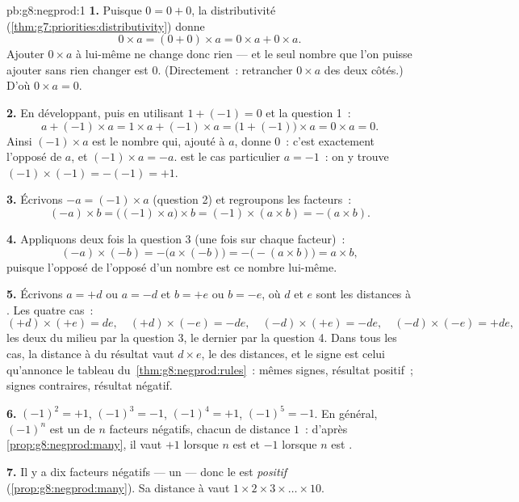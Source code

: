 \begin{solution}{pb:g8:negprod:1}
\textbf{1.} Puisque $0 = 0 + 0$, la distributivité
(\cref{thm:g7:priorities:distributivity}) donne
\[
0 \times a = (0 + 0) \times a = 0 \times a + 0 \times a .
\]
Ajouter $0 \times a$ à lui-même ne change donc rien --- et le seul
nombre que l'on puisse ajouter sans rien changer est $0$.
(Directement~: retrancher $0 \times a$ des deux côtés.) D'où
$0 \times a = 0$.

\textbf{2.} En développant, puis en utilisant $1 + (-1) = 0$ et la
question 1~:
\[
a + (-1) \times a
= 1 \times a + (-1) \times a
= \bigl(1 + (-1)\bigr) \times a
= 0 \times a = 0 .
\]
Ainsi $(-1) \times a$ est le nombre qui, ajouté à $a$, donne $0$~:
c'est exactement l'opposé de $a$, et $(-1) \times a = -a$.
 est le cas particulier $a = -1$~: on y
trouve $(-1) \times (-1) = -(-1) = +1$.

\textbf{3.} Écrivons $-a = (-1) \times a$ (question 2) et
regroupons les facteurs~:
\[
(-a) \times b
= \bigl((-1) \times a\bigr) \times b
= (-1) \times (a \times b)
= -(a \times b) .
\]

\textbf{4.} Appliquons deux fois la question 3 (une fois sur chaque
facteur)~:
\[
(-a) \times (-b)
= -\bigl(a \times (-b)\bigr)
= -\bigl(-(a \times b)\bigr)
= a \times b ,
\]
puisque l'opposé de l'opposé d'un nombre est ce nombre lui-même.

\textbf{5.} Écrivons $a = +d$ ou $a = -d$ et $b = +e$ ou $b = -e$,
où $d$ et $e$ sont les distances à . Les quatre cas~:
\[
(+d) \times (+e) = de, \quad
(+d) \times (-e) = -de, \quad
(-d) \times (+e) = -de, \quad
(-d) \times (-e) = +de,
\]
les deux du milieu par la question 3, le dernier par la question 4.
Dans tous les cas, la distance à  du résultat vaut
$d \times e$, le  des distances, et le signe est celui
qu'annonce le tableau du~\cref{thm:g8:negprod:rules}~: mêmes signes,
résultat positif~; signes contraires, résultat négatif.

\textbf{6.} $(-1)^2 = +1$, $(-1)^3 = -1$, $(-1)^4 = +1$,
$(-1)^5 = -1$. En général, $(-1)^n$ est un  de $n$ facteurs
négatifs, chacun de distance $1$~: d'après
\cref{prop:g8:negprod:many}, il vaut $+1$ lorsque $n$ est  et
$-1$ lorsque $n$ est .

\textbf{7.} Il y a dix facteurs négatifs --- un  --- donc
le  est \emph{positif} (\cref{prop:g8:negprod:many}). Sa
distance à  vaut $1 \times 2 \times 3 \times \dots \times 10$.


\end{solution}
